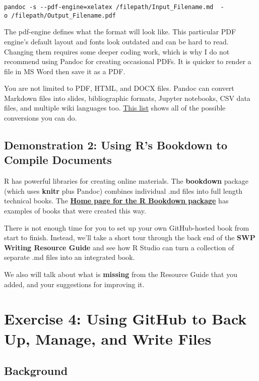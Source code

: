 \documentclass[
]{article}
\begin{document}
\texttt{pandoc\ -s\ -\/-pdf-engine=xelatex\ /filepath/Input\_Filename.md\ \ -o\ /filepath/Output\_Filename.pdf}

The pdf-engine defines what the format will look like. This particular
PDF engine's default layout and fonts look outdated and can be hard to
read. Changing them requires some deeper coding work, which is why I do
not recommend using Pandoc for creating occasional PDFs. It is quicker
to render a file in MS Word then save it as a PDF.

You are not limited to PDF, HTML, and DOCX files. Pandoc can convert
Markdown files into slides, bibliographic formats, Jupyter notebooks,
CSV data files, and multiple wiki languages too.
\href{https://pandoc.org/}{This list} shows all of the possible
conversions you can do.

\hypertarget{demonstration-2-using-rs-bookdown-to-compile-documents}{%
\subsection{Demonstration 2: Using R's Bookdown to Compile
Documents}\label{demonstration-2-using-rs-bookdown-to-compile-documents}}

R has powerful libraries for creating online materials. The
\textbf{bookdown} package (which uses \textbf{knitr} plus Pandoc)
combines individual .md files into full length technical books. The
\textbf{\href{https://bookdown.org/}{Home page for the R Bookdown
package}} has examples of books that were created this way.

There is not enough time for you to set up your own GitHub-hosted book
from start to finish. Instead, we'll take a short tour through the back
end of the \textbf{SWP Writing Resource Guide} and see how R Studio can
turn a collection of separate .md files into an integrated book.

We also will talk about what is \textbf{missing} from the Resource Guide
that you added, and your suggestions for improving it.

\hypertarget{exercise-4-using-github-to-back-up-manage-and-write-files}{%
\section{Exercise 4: Using GitHub to Back Up, Manage, and Write
Files}\label{exercise-4-using-github-to-back-up-manage-and-write-files}}

\hypertarget{background-3}{%
\subsection{Background}\label{background-3}}
\end{document}
